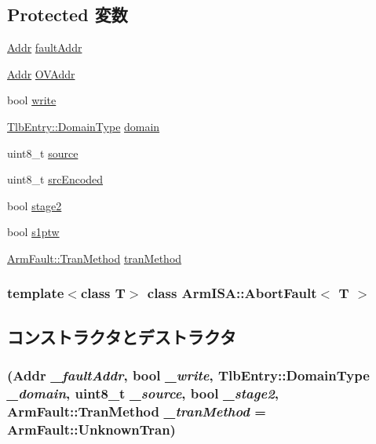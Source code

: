 \subsection*{Protected 変数}
\begin{DoxyCompactItemize}
\item 
\hyperlink{classm5_1_1params_1_1Addr}{Addr} \hyperlink{classArmISA_1_1AbortFault_a39e9eff111c8c7d4acfecc9d3bbd29d4}{faultAddr}
\item 
\hyperlink{classm5_1_1params_1_1Addr}{Addr} \hyperlink{classArmISA_1_1AbortFault_a6d8ab6ddd3da67e07350b2c3ff6c0d80}{OVAddr}
\item 
bool \hyperlink{classArmISA_1_1AbortFault_ab4d8d1259f524270d625ab8933700d27}{write}
\item 
\hyperlink{structArmISA_1_1TlbEntry_a0595b41cfb7d03f18438f9c355a3469d}{TlbEntry::DomainType} \hyperlink{classArmISA_1_1AbortFault_a8f425ac9ed99f5604dcca4b072c88718}{domain}
\item 
uint8\_\-t \hyperlink{classArmISA_1_1AbortFault_a36a99c772ae64e186f5264a662834eef}{source}
\item 
uint8\_\-t \hyperlink{classArmISA_1_1AbortFault_ada7b52f73921c795a241ffd6e381fc69}{srcEncoded}
\item 
bool \hyperlink{classArmISA_1_1AbortFault_a29056d47d3f3a94a388d6f9ba707ef0e}{stage2}
\item 
bool \hyperlink{classArmISA_1_1AbortFault_ad135724e922a94add62100a64854ae84}{s1ptw}
\item 
\hyperlink{classArmISA_1_1ArmFault_ad78237d6390becbe8bdf9e73979c56ae}{ArmFault::TranMethod} \hyperlink{classArmISA_1_1AbortFault_a8f7a9c6fc85261a8c7ffb21d5afeed24}{tranMethod}
\end{DoxyCompactItemize}
\subsubsection*{template$<$class T$>$ class ArmISA::AbortFault$<$ T $>$}



\subsection{コンストラクタとデストラクタ}
\hypertarget{classArmISA_1_1AbortFault_a68effcc3ba0f9938e7571ad7dc83ffcf}{
\subsubsection[{AbortFault}]{ ({\bf Addr} {\em \_\-faultAddr}, \/  bool {\em \_\-write}, \/  {\bf TlbEntry::DomainType} {\em \_\-domain}, \/  uint8\_\-t {\em \_\-source}, \/  bool {\em \_\-stage2}, \/  {\bf ArmFault::TranMethod} {\em \_\-tranMethod} = {\ttfamily ArmFault::UnknownTran})}}
\label{classArmISA_1_1AbortFault_a68effcc3ba0f9938e7571ad7dc83ffcf}



